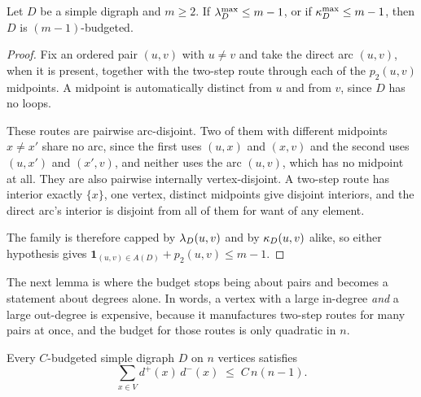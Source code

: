 \begin{lemma}\label{lem:feasible-budgeted}
Let $D$ be a simple digraph and $m \ge 2$. If $\lambda^{\max}_D \le m-1$, or if $\kappa^{\max}_D \le m-1$, then $D$ is $(m-1)$-budgeted.
\end{lemma}

\begin{proof}
Fix an ordered pair $(u,v)$ with $u \ne v$ and take the direct arc $(u,v)$, when it is present, together with the two-step route through each of the $p_2(u,v)$ midpoints. A midpoint is automatically distinct from $u$ and from $v$, since $D$ has no loops.

These routes are pairwise arc-disjoint. Two of them with different midpoints $x \ne x'$ share no arc, since the first uses $(u,x)$ and $(x,v)$ and the second uses $(u,x')$ and $(x',v)$, and neither uses the arc $(u,v)$, which has no midpoint at all. They are also pairwise internally vertex-disjoint. A two-step route has interior exactly $\{x\}$, one vertex, distinct midpoints give disjoint interiors, and the direct arc's interior is disjoint from all of them for want of any element.

The family is therefore capped by $\lambda_D(u,v)$ and by $\kappa_D(u,v)$ alike, so either hypothesis gives $\mathbf{1}_{(u,v) \in A(D)} + p_2(u,v) \le m-1$.
\end{proof}

The next lemma is where the budget stops being about pairs and becomes a statement about degrees alone. In words, a vertex with a large in-degree \emph{and} a large out-degree is expensive, because it manufactures two-step routes for many pairs at once, and the budget for those routes is only quadratic in $n$.

\begin{lemma}\label{lem:budget-degree-sum}
Every $C$-budgeted simple digraph $D$ on $n$ vertices satisfies
\[
    \sum_{x \in V} d^+(x)\,d^-(x) \;\le\; C\,n(n-1) .
\]
\end{lemma}

